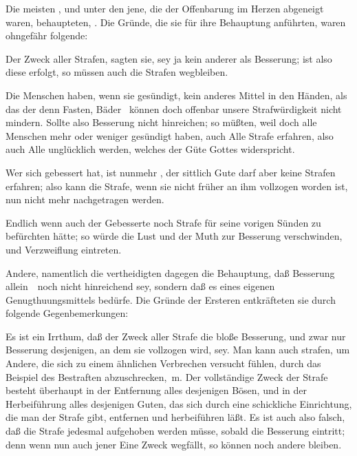 \begin{aufza}
\item Die meisten , und unter den  jene, die der Offenbarung im Herzen abgeneigt waren, behaupteten, . Die Gründe, die sie für ihre Behauptung anführten, waren ohngefähr folgende:
\begin{aufzb}
\item Der Zweck aller Strafen, sagten sie, sey ja kein anderer als Besserung; ist also diese erfolgt, so müssen auch die Strafen wegbleiben.
\item Die Menschen haben, wenn sie gesündigt, kein anderes Mittel in den Händen, als das der  denn Fasten, Bäder \usw\ können doch offenbar unsere Strafwürdigkeit nicht mindern. Sollte also Besserung nicht hinreichen; so müßten, weil doch alle Menschen mehr oder weniger gesündigt haben, auch Alle Strafe erfahren, also auch Alle unglücklich werden, welches der Güte Gottes widerspricht.
\item Wer sich gebessert hat, ist nunmehr , der sittlich Gute darf aber keine Strafen erfahren; also kann die Strafe, wenn sie nicht früher an ihm vollzogen worden ist, nun nicht mehr nachgetragen werden.
\item Endlich wenn auch der Gebesserte noch Strafe für seine vorigen Sünden zu befürchten hätte; so würde die Lust und der Muth zur Besserung verschwinden, und Verzweiflung eintreten.
\end{aufzb}
\item Andere, namentlich die  vertheidigten dagegen die Behauptung, daß Besserung allein~\ noch nicht hinreichend sey, sondern daß es eines eigenen Genugthuungsmittels bedürfe. Die Gründe der Ersteren entkräfteten sie durch folgende Gegenbemerkungen:
\begin{aufzb}
\item Es ist ein Irrthum, daß der Zweck aller Strafe die bloße Besserung, und zwar nur Besserung desjenigen, an dem sie vollzogen wird, sey. Man kann auch strafen, um Andere, die sich zu einem ähnlichen Verbrechen versucht fühlen, durch das Beispiel des Bestraften abzuschrecken, \udgl\,m. Der vollständige Zweck der Strafe besteht überhaupt in der Entfernung alles desjenigen Bösen, und in der Herbeiführung alles desjenigen Guten, das sich durch eine schickliche Einrichtung, die man der Strafe gibt, entfernen und herbeiführen läßt. Es ist auch also falsch, daß die Strafe jedesmal aufgehoben werden müsse, sobald die Besserung eintritt; denn wenn nun auch jener Eine Zweck wegfällt, so können noch andere bleiben.

\end{aufzb}
\end{aufza}
